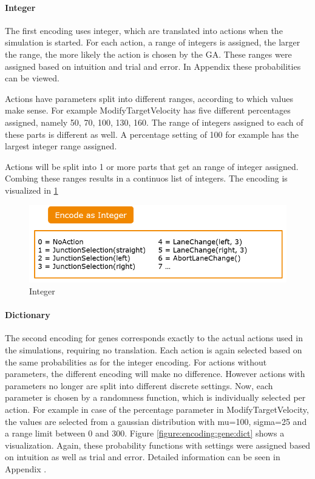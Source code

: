 \paragraph{Integer}
The first encoding uses integer, which are translated into actions when the simulation is started. For each action, a range of integers is assigned, the larger the range, the more likely the action is chosen by the GA. These ranges were assigned based on intuition and trial and error. In Appendix  these probabilities can be viewed.

Actions have parameters split into different ranges, according to which values make sense. For example ModifyTargetVelocity has five different percentages assigned, namely 50, 70, 100, 130, 160. The range of integers assigned to each of these parts is different as well. A percentage setting of 100 for example has the largest integer range assigned.

Actions will be split into 1 or more parts that get an range of integer assigned. Combing these ranges results in a continuos list of integers.
The encoding is visualized in \ref{figure:encoding:gene:int}

\begin{figure}[ht] 
	\includegraphics[width=1\linewidth]{figures/int_encoding}
	\caption{Integer}
	\label{figure:encoding:gene:int}
\end{figure}

\paragraph{Dictionary}
The second encoding for genes corresponds exactly to the actual actions used in the simulations, requiring no translation. Each action is again selected based on the same probabilities as for the integer encoding. For actions without parameters, the different encoding will make no difference. However actions with parameters no longer are split into different discrete settings. Now, each parameter is chosen by a randomness function, which is individually selected per action. For example in case of the percentage parameter in ModifyTargetVelocity, the values are selected from a gaussian distribution with mu=100, sigma=25 and a range limit between 0 and 300. Figure \ref{figure:encoding:gene:dict} shows a visualization. Again, these probability functions with settings were assigned based on intuition as well as trial and error. Detailed information can be seen in Appendix .

